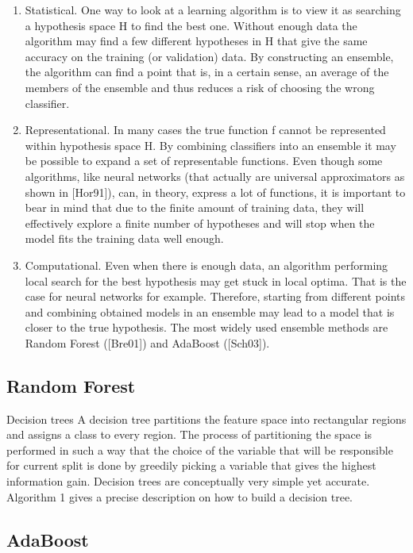 \documentclass[a4paper,12pt,times,numbered,print,index]{Classes/PhDThesisPSnPDF}
\begin{document}
\begin{enumerate}
  \item Statistical. One way to look at a learning algorithm is to view it as searching a hypothesis
space H to find the best one. Without enough data the algorithm may find a few
different hypotheses in H that give the same accuracy on the training (or validation)
data. By constructing an ensemble, the algorithm can find a point that is, in a certain
sense, an average of the members of the ensemble and thus reduces a risk of choosing
the wrong classifier.
  \item Representational. In many cases the true function f cannot be represented within hypothesis
space H. By combining classifiers into an ensemble it may be possible to expand a
set of representable functions. Even though some algorithms, like neural networks (that
actually are universal approximators as shown in [Hor91]), can, in theory, express a lot
of functions, it is important to bear in mind that due to the finite amount of training
data, they will effectively explore a finite number of hypotheses and will stop when the
model fits the training data well enough.
  \item Computational. Even when there is enough data, an algorithm performing local search for
the best hypothesis may get stuck in local optima. That is the case for neural networks
for example. Therefore, starting from different points and combining obtained models
in an ensemble may lead to a model that is closer to the true hypothesis.
The most widely used ensemble methods are Random Forest ([Bre01]) and AdaBoost
([Sch03]).
\end{enumerate}

\subsection{Random Forest}

Decision trees
A decision tree partitions the feature space into rectangular regions and assigns a class to
every region. The process of partitioning the space is performed in such a way that the
choice of the variable that will be responsible for current split is done by greedily picking a
variable that gives the highest information gain. Decision trees are conceptually very simple
yet accurate. Algorithm 1 gives a precise description on how to build a decision tree.

\subsection{AdaBoost}
\end{document}

